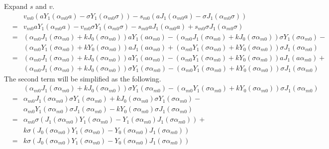 \documentclass{article}
\begin{document}
Expand $s$ and $v$.
\begin{eqnarray}
    & & v_{m0} \left(aY_1(\alpha_{m0}a) - \sigma Y_1(\alpha_{m0}\sigma)\right) -
        s_{m0} \left(aJ_1(\alpha_{m0}a) - \sigma J_1(\alpha_{m0}\sigma)\right)
        \nonumber\\
    &=& v_{m0}aY_1(\alpha_{m0}a) - v_{m0}\sigma Y_1(\alpha_{m0}\sigma) -
        s_{m0}aJ_1(\alpha_{m0}a) + s_{m0}\sigma J_1(\alpha_{m0}\sigma)
        \nonumber\\
    &=& (\alpha_{m0}J_1(\sigma\alpha_{m0}) + kJ_0(\sigma\alpha_{m0}))a      Y_1(a\alpha_{m0}) -
        (\alpha_{m0}J_1(\sigma\alpha_{m0}) + kJ_0(\sigma\alpha_{m0}))\sigma Y_1(\sigma\alpha_{m0}) -
        \nonumber\\
    & & (\alpha_{m0}Y_1(\sigma\alpha_{m0}) + kY_0(\sigma\alpha_{m0}))a      J_1(a\alpha_{m0}) +
        (\alpha_{m0}Y_1(\sigma\alpha_{m0}) + kY_0(\sigma\alpha_{m0}))\sigma J_1(\sigma\alpha_{m0})
        \nonumber\\
    &=& (\alpha_{m0}J_1(\sigma\alpha_{m0}) + kJ_0(\sigma\alpha_{m0}))a      Y_1(a\alpha_{m0}) -
        (\alpha_{m0}Y_1(\sigma\alpha_{m0}) + kY_0(\sigma\alpha_{m0}))a      J_1(a\alpha_{m0}) +
        \nonumber\\
    & & (\alpha_{m0}J_1(\sigma\alpha_{m0}) + kJ_0(\sigma\alpha_{m0}))\sigma Y_1(\sigma\alpha_{m0}) -
        (\alpha_{m0}Y_1(\sigma\alpha_{m0}) + kY_0(\sigma\alpha_{m0}))\sigma J_1(\sigma\alpha_{m0})
\end{eqnarray}
The second term will be simplified as the following.
\begin{eqnarray}
    & & (\alpha_{m0}J_1(\sigma\alpha_{m0}) + kJ_0(\sigma\alpha_{m0}))\sigma Y_1(\sigma\alpha_{m0}) -
        (\alpha_{m0}Y_1(\sigma\alpha_{m0}) + kY_0(\sigma\alpha_{m0}))\sigma J_1(\sigma\alpha_{m0})
        \nonumber\\
    &=& \alpha_{m0}J_1(\sigma\alpha_{m0})\sigma Y_1(\sigma\alpha_{m0}) +
        k          J_0(\sigma\alpha_{m0})\sigma Y_1(\sigma\alpha_{m0}) -
        \nonumber\\
    & & \alpha_{m0}Y_1(\sigma\alpha_{m0})\sigma J_1(\sigma\alpha_{m0}) -
        k          Y_0(\sigma\alpha_{m0})\sigma J_1(\sigma\alpha_{m0})
        \nonumber\\
    &=& \alpha_{m0}\sigma (J_1(\sigma\alpha_{m0}) Y_1(\sigma\alpha_{m0}) -
                           Y_1(\sigma\alpha_{m0}) J_1(\sigma\alpha_{m0})) +
        \nonumber\\
    & & k\sigma (J_0(\sigma\alpha_{m0}) Y_1(\sigma\alpha_{m0}) -
                 Y_0(\sigma\alpha_{m0}) J_1(\sigma\alpha_{m0}))
        \nonumber\\
    &=& k\sigma (J_0(\sigma\alpha_{m0}) Y_1(\sigma\alpha_{m0}) -
                 Y_0(\sigma\alpha_{m0}) J_1(\sigma\alpha_{m0}))
\end{eqnarray}
\end{document}
